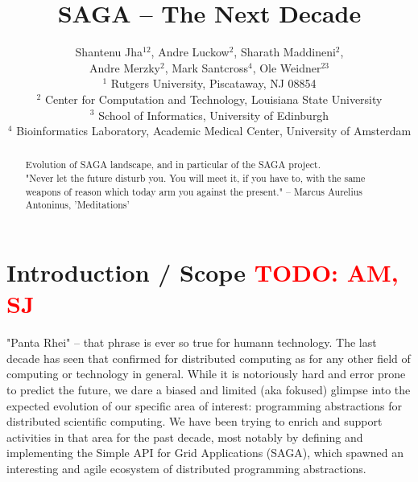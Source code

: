 \documentclass{article}
\newcommand{\B}[1]{\textbf{#1}}
\newcommand{\todo}[1]{{\textcolor{red}{\B{TODO:} #1 }}}
\begin{document}
\title{\large SAGA -- The Next Decade}

\author{
        Shantenu Jha$^{12}$,
        Andre Luckow$^{2}$,
        Sharath Maddineni$^{2}$,\\
        Andre Merzky$^{2}$,
        Mark Santcross$^{4}$,
        Ole Weidner$^{23}$
        \\[1em]
        $^1$\small
         Rutgers University, 
         Piscataway, NJ 08854\\[-0.3em]
        $^2$ \small
          Center for Computation and Technology, 
          Louisiana State University\\[-0.3em]
        $^3$ \small
          School of Informatics, 
          University of Edinburgh \\[-0.3em]  
        $^4$ \small
         Bioinformatics Laboratory, Academic Medical Center, 
         University of Amsterdam\\[-0.3em]
       }

\maketitle

\begin{abstract}
 Evolution of SAGA landscape, and in particular of the SAGA project.\\

 "Never let the future disturb you. You will meet it, if you have to, 
  with the same weapons of reason which today arm you against the present."
  -- Marcus Aurelius Antoninus, 'Meditations'\\
\end{abstract}

\section{Introduction / Scope \todo{AM, SJ}}

 "Panta Rhei" -- that phrase is ever so true for humann technology.
 The last decade has seen that confirmed for distributed computing as
 for any other field of computing or technology in general.  While it
 is notoriously hard and error prone to predict the future, we dare a
 biased and limited (aka fokused) glimpse into the expected evolution
 of our specific area of interest: programming abstractions for
 distributed scientific computing.  We have been trying to enrich and
 support activities in that area for the past decade, most notably by
 defining and implementing the Simple API for Grid Applications
 (SAGA), which spawned an interesting and agile ecosystem of
 distributed programming abstractions.
\end{document}
